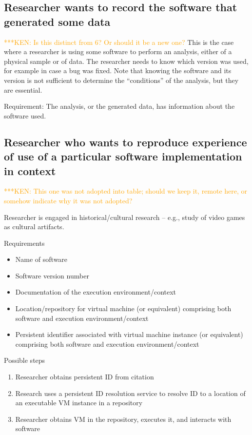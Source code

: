 \documentclass[12pt, oneside]{amsart}
\newcommand{\niemnote}[1]{ {\textcolor{orange} { ***KEN: #1 }}} %
\begin{document}
\subsection{Researcher wants to record the software that generated some data}

\niemnote{Is this distinct from 6? Or should it be a new one?}
This is the case where a researcher is using some software to perform an analysis, either of a physical sample or of data.
The researcher needs to know which version was used, for example in case a bug was fixed.
Note that knowing the software and its version is not sufficient to determine the ``conditions'' of the analysis, but they are essential.

Requirement:
The analysis, or the generated data, has information about the software used.

\subsection{Researcher who wants to reproduce experience of use of a particular software implementation in context}

\niemnote{This one was not adopted into table; should we keep it, remote here, or somehow indicate why it was not adopted?}

Researcher is engaged in historical/cultural research -- e.g., study of video games as cultural artifacts.

Requirements
\begin{itemize}
\item Name of software
\item Software version number
\item Documentation of the execution environment/context
\item Location/repository for virtual machine (or equivalent) comprising both software and execution environment/context
\item Persistent identifier associated with virtual machine instance (or equivalent) comprising both software and execution environment/context
\end{itemize}

Possible steps
\begin{enumerate}
\item Researcher obtains persistent ID from citation
\item Research uses a persistent ID resolution service to resolve ID to a location of  an executable VM instance in a repository
\item Researcher obtains VM in the repository, executes it, and interacts with software
\end{enumerate}
\end{document}
